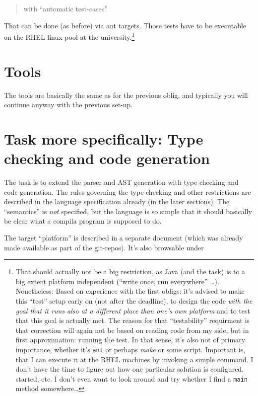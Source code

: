 \documentclass[11pt,freeform]{handout}[2014/08/13]
\begin{document}
\begin{quote}
  with ``automatic test-cases''
\end{quote}
That can be done (as before) via ant targets. Those tests have to be
executable on the RHEL linux pool at the university.\footnote{That should
  actually not be a big restriction, as Java (and the task) is to a big
  extent platform independent (``write once, run everywhere''
  \ldots). Nonetheless: Based on experience with the first obligs: it's
  advised to make this ``test'' setup early on (not after the deadline), to
  design the code \emph{with the goal that it runs also at a different
    place than one's own platform} and to test that this goal is actually
  met. The reason for that ``testability'' requirment is that correction
  will again not be based on reading code from my side, but in first
  approximation: running the test. In that sense, it's also not of primary
  importance, whether it's \texttt{ant} or perhaps \emph{make} or some
  script. Important is, that I can execute it at the RHEL machines by
  invoking a simple command.  I don't have the time to figure out how one
  particular solution is configured, started, etc. I don't even want to
  look around and try whether I find a \texttt{main} method somewhere\ldots
}


\section{Tools}


The tools are basically the same as for the previous oblig, and typically
you will continue anyway with the previous set-up. 




\section{Task more specifically: Type checking and code generation}
\label{sec:task-more-spec}



The task is to extend the parser and AST generation with type checking and
code generation. The rules governing the type checking and other
restrictions are described in the language specification already (in the
later sections). The ``semantics'' is \emph{not} specified, but the
language is so simple that it should basically be clear what a compila
program is supposed to do.

The target ``platform'' is described in a separate document (which was
already made available as part of the git-repos). It's also browsable under
\end{document}
